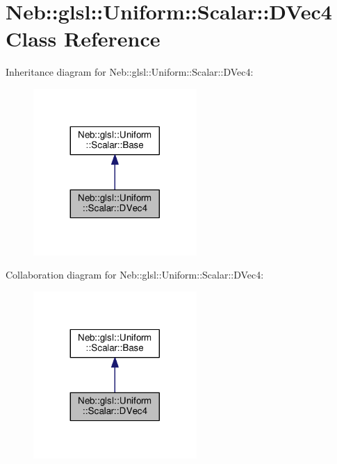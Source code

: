 \hypertarget{classNeb_1_1glsl_1_1Uniform_1_1Scalar_1_1DVec4}{\section{Neb\-:\-:glsl\-:\-:Uniform\-:\-:Scalar\-:\-:D\-Vec4 Class Reference}
\label{classNeb_1_1glsl_1_1Uniform_1_1Scalar_1_1DVec4}
}


Inheritance diagram for Neb\-:\-:glsl\-:\-:Uniform\-:\-:Scalar\-:\-:D\-Vec4\-:
\nopagebreak
\begin{figure}[H]
\begin{center}
\leavevmode
\includegraphics[width=176pt]{classNeb_1_1glsl_1_1Uniform_1_1Scalar_1_1DVec4__inherit__graph}
\end{center}
\end{figure}


Collaboration diagram for Neb\-:\-:glsl\-:\-:Uniform\-:\-:Scalar\-:\-:D\-Vec4\-:
\nopagebreak
\begin{figure}[H]
\begin{center}
\leavevmode
\includegraphics[width=176pt]{classNeb_1_1glsl_1_1Uniform_1_1Scalar_1_1DVec4__coll__graph}
\end{center}
\end{figure}
